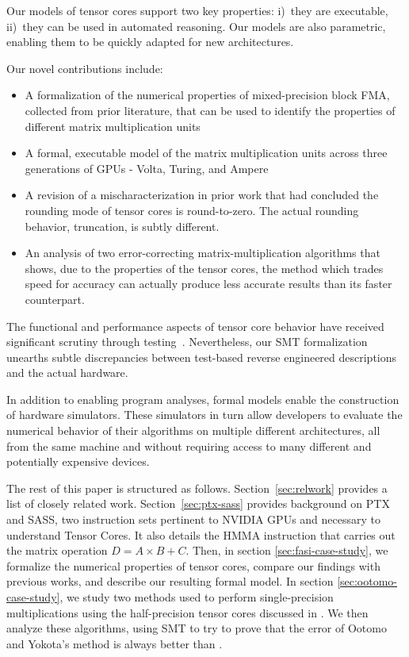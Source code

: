 Our models of tensor cores support two key properties: i)~they are executable, ii)~they can be used in automated reasoning. Our models are also parametric, enabling them to be quickly adapted for new architectures.

Our novel contributions include:

\begin{itemize}
\item A formalization of the numerical properties of mixed-precision block FMA, collected from prior literature, that can be used to identify the properties of different matrix multiplication units
\item A formal, executable model of the matrix multiplication units across three generations of GPUs - Volta, Turing, and Ampere
\item A revision of a mischaracterization in prior work that had concluded the rounding mode of tensor cores is round-to-zero. The actual rounding behavior, truncation, is subtly different. 
\item An analysis of two error-correcting matrix-multiplication algorithms that shows, due to the properties of the tensor cores, the method which trades speed for accuracy can actually produce less accurate results than its faster counterpart.
\end{itemize}

The functional and performance aspects of tensor core behavior have received significant scrutiny through testing~\cite{sun2022dissecting,fasi2021numerical,yan2020demystifying}.
Nevertheless, our SMT formalization unearths subtle discrepancies between test-based reverse engineered descriptions and the actual hardware.

In addition to enabling program analyses, formal models enable the construction of hardware simulators. These simulators in turn allow developers to evaluate the numerical behavior of their algorithms on multiple different architectures, all from the same machine and without requiring access to many different and potentially expensive devices. 

The rest of this paper is structured as follows. 
Section~\ref{sec:relwork}
provides a list of closely related work.
Section~\ref{sec:ptx-sass} provides
background on PTX and SASS, two instruction sets pertinent to
NVIDIA GPUs and necessary to understand Tensor Cores. It also details the HMMA instruction that carries out the matrix
operation $D=A\times B+C$.
Then, in section \ref{sec:fasi-case-study}, we formalize the numerical properties of tensor cores, compare our findings with previous works, and describe our resulting formal model. In section \ref{sec:ootomo-case-study}, we study two methods used to perform single-precision multiplications using the half-precision tensor cores discussed in \citet{ootomo2022recovering}.  We then analyze these algorithms, using SMT to try to prove that the error of Ootomo and Yokota's method is always better than \citet{markidis}.



 
  
